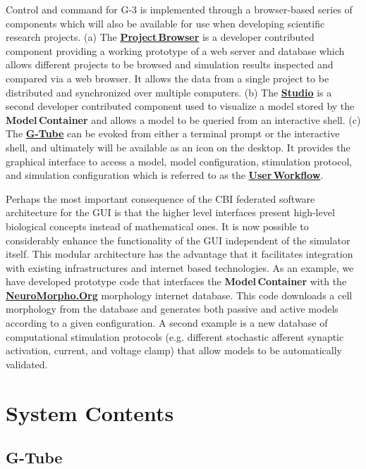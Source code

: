 \documentclass[12pt]{article}
\begin{document}
Control and command for G-3 is implemented through a browser-based series of components which will also be available for use when developing scientific research projects. (a) The \href{../project-browser/project-browser.tex}{\bf Project\,Browser} is a developer contributed component providing a working prototype of a web server and database which allows different projects to be browsed and simulation results inspected and compared via a web browser. It allows the data from a single project to be distributed and synchronized over multiple computers. (b) The \href{../studio/studio.tex}{\bf Studio} is a second developer contributed component used to visualize a model stored by the {\bf Model\,Container} and allows a model to be queried from an interactive shell.  (c) The \href{../gtube/gtube.tex}{\bf G-Tube} can be evoked from either a terminal prompt or the interactive shell, and ultimately will be available as an icon on the desktop.  It provides the graphical interface to access a model, model configuration, stimulation protocol, and simulation configuration which is referred to as the \href{../workflow-user/workflow-user.tex}{\bf User\,Workflow}.

Perhaps the most important consequence of the CBI federated software architecture for the GUI is that the higher level interfaces present high-level biological concepts instead of mathematical ones.  It is now possible to considerably enhance the functionality of the GUI independent of the simulator itself.  This modular architecture has the advantage that it facilitates integration with existing infrastructures and internet based technologies. As an example, we have developed prototype code that interfaces the {\bf Model\,Container} with the \href{http://neuromorpho.org/neuroMorpho/index.jsp}{\bf NeuroMorpho.Org} morphology internet database. This code downloads a cell morphology from the database and generates both passive and active models according to a given configuration. A second example is a new database of computational stimulation protocols (e.g. different stochastic afferent synaptic activation, current, and voltage clamp) that allow models to be automatically validated.

\section*{System Contents}

\subsection*{G-Tube}
\end{document}
